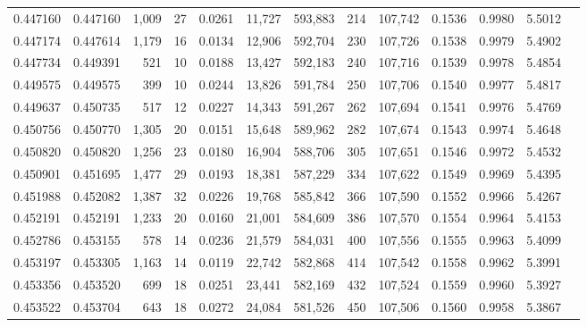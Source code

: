 \begin{tabular}{rrrrrrrrrrrrr}
0.447160 & 0.447160 & 1,009 &    27 &                                     0.0261 &  11,727 & 593,883 &     214 & 107,742 & 0.1536 & 0.9980 & 5.5012 \\
0.447174 & 0.447614 & 1,179 &    16 &                                     0.0134 &  12,906 & 592,704 &     230 & 107,726 & 0.1538 & 0.9979 & 5.4902 \\
0.447734 & 0.449391 &   521 &    10 &                                     0.0188 &  13,427 & 592,183 &     240 & 107,716 & 0.1539 & 0.9978 & 5.4854 \\
0.449575 & 0.449575 &   399 &    10 &                                     0.0244 &  13,826 & 591,784 &     250 & 107,706 & 0.1540 & 0.9977 & 5.4817 \\
0.449637 & 0.450735 &   517 &    12 &                                     0.0227 &  14,343 & 591,267 &     262 & 107,694 & 0.1541 & 0.9976 & 5.4769 \\
0.450756 & 0.450770 & 1,305 &    20 &                                     0.0151 &  15,648 & 589,962 &     282 & 107,674 & 0.1543 & 0.9974 & 5.4648 \\
0.450820 & 0.450820 & 1,256 &    23 &                                     0.0180 &  16,904 & 588,706 &     305 & 107,651 & 0.1546 & 0.9972 & 5.4532 \\
0.450901 & 0.451695 & 1,477 &    29 &                                     0.0193 &  18,381 & 587,229 &     334 & 107,622 & 0.1549 & 0.9969 & 5.4395 \\
0.451988 & 0.452082 & 1,387 &    32 &                                     0.0226 &  19,768 & 585,842 &     366 & 107,590 & 0.1552 & 0.9966 & 5.4267 \\
0.452191 & 0.452191 & 1,233 &    20 &                                     0.0160 &  21,001 & 584,609 &     386 & 107,570 & 0.1554 & 0.9964 & 5.4153 \\
0.452786 & 0.453155 &   578 &    14 &                                     0.0236 &  21,579 & 584,031 &     400 & 107,556 & 0.1555 & 0.9963 & 5.4099 \\
0.453197 & 0.453305 & 1,163 &    14 &                                     0.0119 &  22,742 & 582,868 &     414 & 107,542 & 0.1558 & 0.9962 & 5.3991 \\
0.453356 & 0.453520 &   699 &    18 &                                     0.0251 &  23,441 & 582,169 &     432 & 107,524 & 0.1559 & 0.9960 & 5.3927 \\
0.453522 & 0.453704 &   643 &    18 &                                     0.0272 &  24,084 & 581,526 &     450 & 107,506 & 0.1560 & 0.9958 & 5.3867 \\

\end{tabular}
